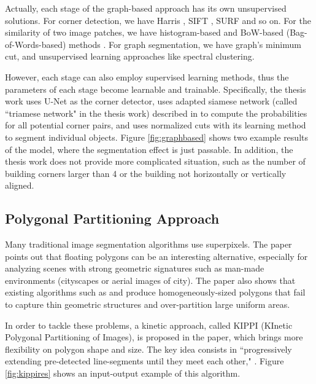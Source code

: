 Actually, each stage of the graph-based approach has its own unsupervised solutions. For corner detection, we have Harris \cite{harris}, SIFT \cite{sift}, SURF \cite{surf} and so on. For the similarity of two image patches, we have histogram-based \cite{histbook} and BoW-based (Bag-of-Words-based) methods \cite{bow}. For graph segmentation, we have graph's minimum cut, and unsupervised learning approaches like spectral clustering.

However, each stage can also employ supervised learning methods, thus the parameters of each stage become learnable and trainable. Specifically, the thesis work \cite{msnadine} uses U-Net \cite{unet} as the corner detector, uses adapted siamese network (called ``triamese network" in the thesis work) described in \cite{siamese} to compute the probabilities for all potential corner pairs, and uses normalized cuts \cite{normcut} with its learning method \cite{normcutlearn} to segment individual objects. Figure \ref{fig:graphbased} shows two example results of the model, where the segmentation effect is just passable. In addition, the thesis work does not provide more complicated situation, such as the number of building corners larger than 4 or the building not horizontally or vertically aligned.



\subsection{Polygonal Partitioning Approach}\label{ppapp}
Many traditional image segmentation algorithms use superpixels. The paper \cite{kippi} points out that floating polygons can be an interesting alternative, especially for analyzing scenes with strong geometric signatures such as man-made environments (cityscapes or aerial images of city). The paper also shows that existing algorithms such as \cite{forsytheimgseg} and \cite{duanimgseg} produce homogeneously-sized polygons that fail to capture thin geometric structures and over-partition large uniform areas.

In order to tackle these problems, a kinetic approach, called KIPPI (KInetic Polygonal Partitioning of Images), is proposed in the paper, which brings more flexibility on polygon shape and size. The key idea consists in ``progressively extending pre-detected line-segments until they meet each other," \cite{kippi}. Figure \ref{fig:kippires} shows an input-output example of this algorithm.



